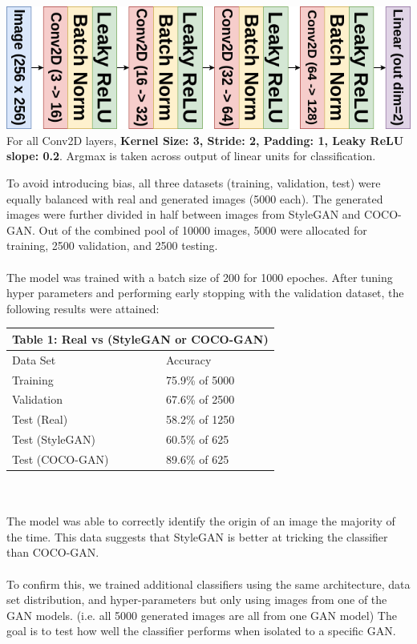 \documentclass[10pt]{article}
\begin{document}
\begin{multicols*}{2}
        \includegraphics[scale=0.4]{c2st-diagram.png}\\
        For all Conv2D layers, \textbf{Kernel Size: 3, Stride: 2, Padding: 1, Leaky ReLU slope: 0.2}.
        Argmax is taken across output of linear units for classification.

        To avoid introducing bias, all three datasets (training, validation, test) were equally balanced with real and generated images (5000 each).
        The generated images were further divided in half between images from StyleGAN and COCO-GAN.
        Out of the combined pool of 10000 images, 5000 were allocated for training, 2500 validation, and 2500 testing.
        \\\\
        The model was trained with a batch size of 200 for 1000 epoches.
        After tuning hyper parameters and performing early stopping with the validation dataset, the following results were attained:\\

        \begin{tabular}{ |p{4cm}|p{3cm}|  }
         \hline
         \multicolumn{2}{|c|}{Table 1: Real vs (StyleGAN or COCO-GAN)} \\
         \hline
        Data Set     & Accuracy\\
         \hline
        Training        & 75.9\% of 5000 \\
         \hline
        Validation      & 67.6\% of 2500 \\
         \hline
        Test (Real)     & 58.2\% of 1250 \\
         \hline
        Test (StyleGAN) & 60.5\% of 625  \\
         \hline
        Test (COCO-GAN) & 89.6\% of 625 \\
         \hline
        \end{tabular}
        \\\\
        The model was able to correctly identify the origin of an image the majority of the time.
        This data suggests that StyleGAN is better at tricking the classifier than COCO-GAN.
        \\\\
        To confirm this, we trained additional classifiers using the same architecture, data set distribution, and hyper-parameters but only using images from one of the GAN models.
        (i.e. all 5000 generated images are all from one GAN model)
        The goal is to test how well the classifier performs when isolated to a specific GAN.\\


\end{multicols*}
\end{document}
